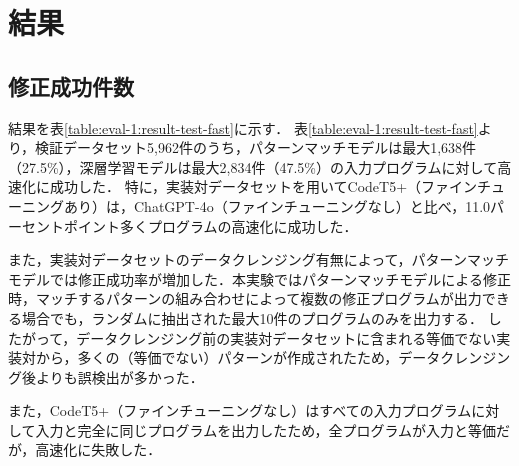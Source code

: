 \documentclass[11pt]{jreport}
\newcommand{\fix}[1]{#1}
\newcommand{\fixtwo}[1]{#1}
\begin{document}


\section{結果}\label{sec:result}




\subsection{\fix{修正成功件数}}


結果を表\ref{table:eval-1:result-test-fast}に示す．
表\ref{table:eval-1:result-test-fast}より，検証データセット5,962件のうち，パターンマッチモデルは最大1,638件（27.5\%），深層学習モデルは最大2,834件（47.5\%）の入力プログラムに対して高速化に成功した．
特に，実装対データセットを用いて\fixtwo{CodeT5+（ファインチューニングあり）}は，\fixtwo{ChatGPT-4o（ファインチューニングなし）}と比べ，11.0\fix{パーセント}ポイント多くプログラムの高速化に成功した．

\fix{また，実装対データセットのデータクレンジング有無によって，パターンマッチモデルでは修正成功率が増加した．本実験ではパターンマッチモデルによる修正時，マッチするパターンの組み合わせによって複数の修正プログラムが出力できる場合でも，ランダムに抽出された最大10件のプログラムのみを出力する．
したがって，データクレンジング前の実装対データセットに含まれる等価でない実装対から，多くの（等価でない）パターンが作成されたため，データクレンジング後よりも誤検出が多かった．}

\fix{また，CodeT5+（ファインチューニングなし）はすべての入力プログラムに対して入力と完全に同じプログラムを出力したため，全プログラムが入力と等価だが，高速化に失敗した．}
\end{document}
